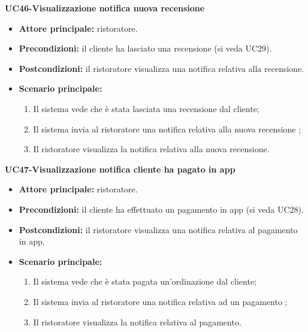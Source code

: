 \textbf{UC46-Visualizzazione notifica nuova recensione}
\begin{itemize}
\item \textbf{Attore principale:} ristoratore.
\item \textbf{Precondizioni:} il cliente ha lasciato una recensione (si veda UC29).
\item \textbf{Postcondizioni:} il ristoratore visualizza una notifica relativa alla recensione.
\item \textbf{Scenario principale:}
\begin{enumerate}
    \item Il sistema vede che è stata lasciata una recensione dal cliente;
    \item Il sistema invia al ristoratore una notifica relativa alla nuova recensione ;
    \item Il ristoratore visualizza la notifica relativa alla nuova recensione.
\end{enumerate}
\end{itemize}

\textbf{UC47-Visualizzazione notifica cliente ha pagato in app}
\begin{itemize}
\item \textbf{Attore principale:} ristoratore.
\item \textbf{Precondizioni:} il cliente ha effettuato un pagamento in app (si veda UC28).
\item \textbf{Postcondizioni:} il ristoratore visualizza una notifica relativa al pagamento in app.
\item \textbf{Scenario principale:}
\begin{enumerate}
    \item Il sistema vede che è stata pagata un'ordinazione dal cliente;
    \item Il sistema invia al ristoratore una notifica relativa ad un pagamento ;
    \item Il ristoratore visualizza la notifica relativa al pagamento.
\end{enumerate}
\end{itemize}

